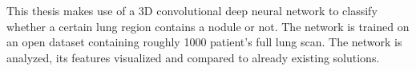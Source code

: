 \documentclass[main.tex]{subfiles}
\begin{document}
This thesis makes use of a 3D convolutional deep neural network to classify whether a certain lung region contains a nodule or not. The network is trained on an open dataset containing roughly 1000 patient's full lung scan. The network is analyzed, its features visualized and compared to already existing solutions.
\end{document}
